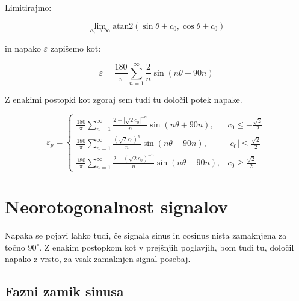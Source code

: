 Limitirajmo:

\begin{equation}
\lim_{c_0 \rightarrow \infty} \mathrm{atan2}(\sin{\theta} + c_0,\cos{\theta}+ c_0) 
\end{equation}


in napako $\varepsilon$ zapišemo kot:

\begin{equation}
\varepsilon = \frac{180}{\pi}\sum_{n=1}^{\infty}\frac{2}{n} \sin (n \theta- 90 n)
\end{equation}


Z enakimi postopki kot zgoraj sem tudi tu določil potek napake.


\begin{equation}
\label{vrsta_sincosoff}
\varepsilon_p=
\begin{cases}
\frac{180}{\pi}\sum_{n=1}^{\infty}\frac{2-|\sqrt{2}c_0|^{-n}}{n} \sin (n \theta + 90 n), & c_0\leq -\frac{\sqrt{2}}{2} \\
\frac{180}{\pi}\sum_{n=1}^{\infty}\frac{(\sqrt{2}c_0)^n}{n} \sin (n \theta - 90 n), & |c_0|\leq \frac{\sqrt{2}}{2} \\
\frac{180}{\pi}\sum_{n=1}^{\infty}\frac{2-(\sqrt{2}c_0)^{-n}}{n} \sin (n \theta - 90 n), & c_0\geq \frac{\sqrt{2}}{2}
\end{cases}
\end{equation}





\section{Neorotogonalnost signalov}

Napaka se pojavi lahko tudi, če signala sinus in cosinus nista zamaknjena za točno $90^\circ$. Z enakim postopkom kot v prejšnjih poglavjih, bom tudi tu, določil napako z vrsto, za vsak zamaknjen signal posebaj.

\subsection{Fazni zamik sinusa}

